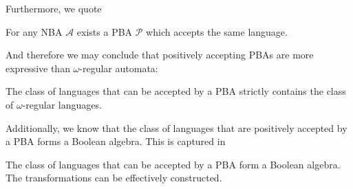 Furthermore, we quote
\begin{lemma}
  \cite[Lemma 5]{RecOmeLangProbAuto} For any \ac{NBA} $\mathcal{A}$ exists a
  \ac{PBA} $\mathcal{P}$ which accepts the same language.
\end{lemma}
And therefore we may conclude that positively accepting \acp{PBA} are more
expressive than $\omega$-regular automata:
\begin{theorem}
  \cite[Theorem 4]{RecOmeLangProbAuto}
  The class of languages that can be accepted by a \ac{PBA} strictly contains
  the class of $\omega$-regular languages.
\end{theorem}
Additionally, we know that the class of languages that are positively accepted 
by a \ac{PBA} forms a Boolean algebra. This is captured in
\begin{theorem}
  \cite[Chapter 4.3.]{Groesser}
  The class of languages that can be accepted by a \ac{PBA} form a Boolean 
  algebra. The transformations can be effectively constructed.
  \label{thm:pbaboolalgebra}
\end{theorem}
